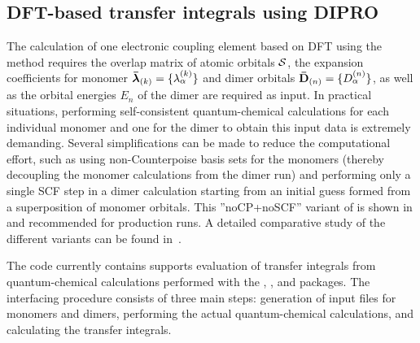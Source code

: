 \subsection{DFT-based transfer integrals using DIPRO}
\label{sec:dft}

The calculation of one electronic coupling element based on DFT using the \dipro method requires the overlap matrix of atomic orbitals $\mathbf{ \mathcal{S} }$, the expansion coefficients for monomer $\mathbf{ \bar{\boldsymbol{\lambda}} }_{(k)} = \{ \lambda_\alpha^{(k)}\}$ and dimer orbitals $\mathbf{ \bar{D} }_{(n)} = \{ D^{(n)}_{\alpha} \}$, as well as the orbital energies $E_{n}$ of the dimer are required as input. In practical situations, performing self-consistent quantum-chemical calculations for each individual monomer and one for the dimer to obtain this input data is extremely demanding. Several simplifications can be made to reduce the computational effort, such as using non-Counterpoise basis sets for the monomers (thereby decoupling the monomer calculations from the dimer run) and performing only a single SCF step in a dimer calculation starting from an initial guess formed from a superposition of monomer orbitals. This ''noCP+noSCF'' variant of \dipro is shown in  and recommended for production runs. 
A detailed comparative study of the different variants can be found in~\cite{baumeier_density-functional_2010}.

The code currently contains supports evaluation of transfer integrals from quantum-chemical calculations performed with the \gaussian, \turbomole, and \nwchem packages. The interfacing procedure consists of three main steps: generation of input files for monomers and dimers, performing the actual quantum-chemical calculations, and calculating the transfer integrals. 

